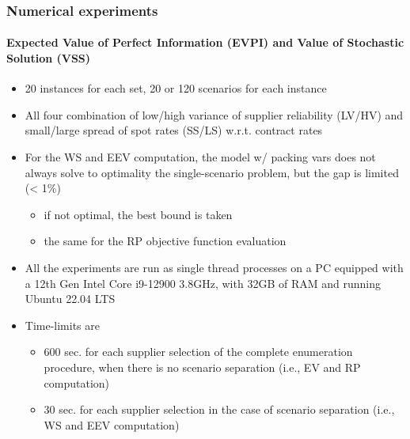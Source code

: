 \documentclass[9pt,xcolor={dvipsnames}]{beamer}
\begin{document}
\begin{frame}%
	\frametitle{Numerical experiments}
	\framesubtitle{Expected Value of Perfect Information (EVPI) and Value of Stochastic Solution (VSS)}
	\begin{itemize}
		\small
		\item<1-> 20 instances for each set, 20 or 120 scenarios for each instance
		\bigskip
		\item<2-> All four combination of low/high variance of supplier reliability (LV/HV) and small/large spread of spot rates (SS/LS) w.r.t. contract rates
		\bigskip
		\item<3-> For the WS and EEV computation, the model w/ packing vars does not always solve to optimality the single-scenario problem, but the gap is limited (< 1\%)
		\begin{itemize}
			\item<3-> if not optimal, the best bound is taken
			\item<4-> the same for the RP objective function evaluation
		\end{itemize}
		\bigskip
		\item<5-> All the experiments are run as single thread processes on a PC equipped with a 12th Gen Intel Core i9-12900 3.8GHz, with 32GB of RAM and running Ubuntu 22.04 LTS
		\bigskip
		\item<6-> Time-limits are
		\begin{itemize}
			\item<6-> 600 sec. for each supplier selection of the complete enumeration procedure, when there is no scenario separation (i.e., EV and RP computation)
			\item<7->  30 sec. for each supplier selection in the case of scenario separation (i.e., WS and EEV computation)
		\end{itemize}
	\end{itemize}
\end{frame}
\end{document}
